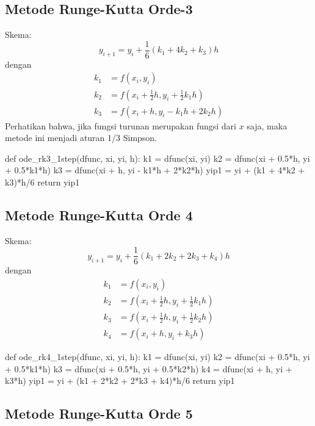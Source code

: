 \subsection{Metode Runge-Kutta Orde-3}

Skema:
\begin{equation*}
y_{i+1} = y_i + \frac{1}{6}(k_1 + 4k_2 + k_3)h
\end{equation*}
dengan
\begin{align*}
k_1 & = f(x_i, y_i) \\
k_2 & = f(x_i + \frac{1}{2}h, y_i + \frac{1}{2} k_1 h ) \\
k_3 & = f(x_i + h, y_i - k_1 h + 2 k_2 h)
\end{align*}
Perhatikan bahwa, jika fungsi turunan merupakan fungsi dari $x$ saja, maka metode ini menjadi
aturan 1/3 Simpson.


\begin{pythoncode}
def ode_rk3_1step(dfunc, xi, yi, h):
    k1 = dfunc(xi, yi)
    k2 = dfunc(xi + 0.5*h, yi + 0.5*k1*h)
    k3 = dfunc(xi + h, yi - k1*h + 2*k2*h)
    yip1 = yi + (k1 + 4*k2 + k3)*h/6
    return yip1
\end{pythoncode}

\subsection{Metode Runge-Kutta Orde 4}

Skema:
\begin{equation*}
y_{i+1} = y_{i} + \frac{1}{6}(k_1 + 2k_2 + 2k_3 + k_4) h
\end{equation*}
dengan
\begin{align*}
k_1 & = f(x_i, y_i) \\
k_2 & = f\left( x_i + \frac{1}{2}h, y_i + \frac{1}{2} k_1 h \right) \\
k_3 & = f\left( x_i + \frac{1}{2}h, y_i + \frac{1}{2} k_2 h \right) \\
k_4 & = f(x_i + h, y_i + k_3 h)
\end{align*}

\begin{pythoncode}
def ode_rk4_1step(dfunc, xi, yi, h):
    k1 = dfunc(xi, yi)
    k2 = dfunc(xi + 0.5*h, yi + 0.5*k1*h)
    k3 = dfunc(xi + 0.5*h, yi + 0.5*k2*h)
    k4 = dfunc(xi + h, yi + k3*h)
    yip1 = yi + (k1 + 2*k2 + 2*k3 + k4)*h/6
    return yip1
\end{pythoncode}


\subsection{Metode Runge-Kutta Orde 5}

